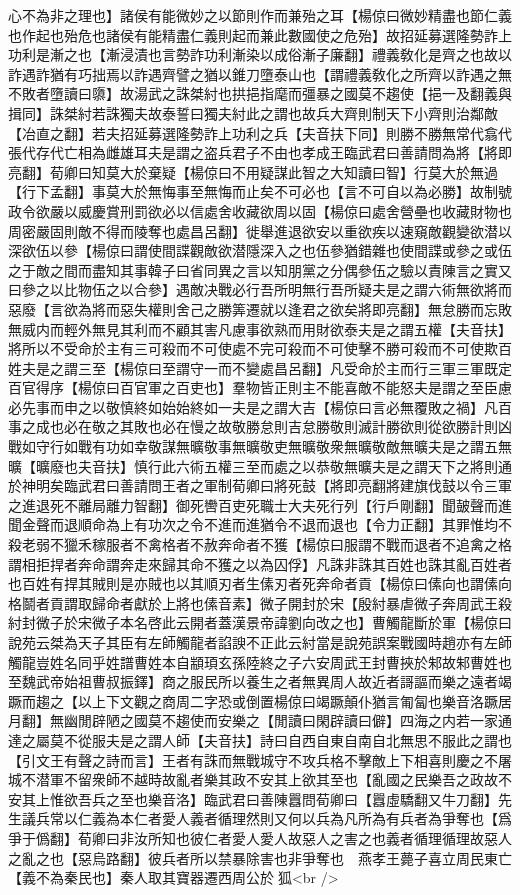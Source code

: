 心不為非之理也】諸侯有能微妙之以節則作而兼殆之耳【楊倞曰微妙精盡也節仁義也作起也殆危也諸侯有能精盡仁義則起而兼此數國使之危殆】故招延募選隆勢詐上功利是漸之也【漸浸漬也言勢詐功利漸染以成俗漸子廉翻】禮義敎化是齊之也故以詐遇詐猶有巧拙焉以詐遇齊譬之猶以錐刀墮泰山也【謂禮義敎化之所齊以詐遇之無不敗者墮讀曰隳】故湯武之誅桀紂也拱挹指麾而彊暴之國莫不趨使【挹一及翻義與揖同】誅桀紂若誅獨夫故泰誓曰獨夫紂此之謂也故兵大齊則制天下小齊則治鄰敵【冶直之翻】若夫招延募選隆勢詐上功利之兵【夫音扶下同】則勝不勝無常代翕代張代存代亡相為雌雄耳夫是謂之盗兵君子不由也孝成王臨武君曰善請問為將【將即亮翻】荀卿曰知莫大於棄疑【楊倞曰不用疑謀此智之大知讀曰智】行莫大於無過【行下孟翻】事莫大於無悔事至無悔而止矣不可必也【言不可自以為必勝】故制號政令欲嚴以威慶賞刑罰欲必以信處舍收藏欲周以固【楊倞曰處舍營壘也收藏財物也周密嚴固則敵不得而陵奪也處昌呂翻】徙舉進退欲安以重欲疾以速窺敵觀變欲潜以深欲伍以參【楊倞曰謂使間諜觀敵欲潜隱深入之也伍參猶錯雜也使間諜或參之或伍之于敵之間而盡知其事韓子曰省同異之言以知朋黨之分偶參伍之驗以責陳言之實又曰參之以比物伍之以合參】遇敵决戰必行吾所明無行吾所疑夫是之謂六術無欲將而惡廢【言欲為將而惡失權則舍己之勝筭遷就以逢君之欲矣將即亮翻】無怠勝而忘敗無威内而輕外無見其利而不顧其害凡慮事欲熟而用財欲泰夫是之謂五權【夫音扶】將所以不受命於主有三可殺而不可使處不完可殺而不可使擊不勝可殺而不可使欺百姓夫是之謂三至【楊倞曰至謂守一而不變處昌呂翻】凡受命於主而行三軍三軍既定百官得序【楊倞曰百官軍之百吏也】羣物皆正則主不能喜敵不能怒夫是謂之至臣慮必先事而申之以敬慎終如始始終如一夫是之謂大吉【楊倞曰言必無覆敗之禍】凡百事之成也必在敬之其敗也必在慢之故敬勝怠則吉怠勝敬則滅計勝欲則從欲勝計則凶戰如守行如戰有功如幸敬謀無曠敬事無曠敬吏無曠敬衆無曠敬敵無曠夫是之謂五無曠【曠廢也夫音扶】慎行此六術五權三至而處之以恭敬無曠夫是之謂天下之將則通於神明矣臨武君曰善請問王者之軍制荀卿曰將死鼓【將即亮翻將建旗伐鼓以令三軍之進退死不離局離力智翻】御死轡百吏死職士大夫死行列【行戶剛翻】聞皷聲而進聞金聲而退順命為上有功次之令不進而進猶令不退而退也【令力正翻】其罪惟均不殺老弱不獵禾稼服者不禽格者不赦奔命者不獲【楊倞曰服謂不戰而退者不追禽之格謂相拒捍者奔命謂奔走來歸其命不獲之以為囚俘】凡誅非誅其百姓也誅其亂百姓者也百姓有捍其賊則是亦賊也以其順刃者生傃刃者死奔命者貢【楊倞曰傃向也謂傃向格鬬者貢謂取歸命者獻於上將也傃音素】微子開封於宋【殷紂暴虐微子奔周武王殺紂封微子於宋微子本名啓此云開者蓋漢景帝諱劉向改之也】曹觸龍斷於軍【楊倞曰說苑云桀為天子其臣有左師觸龍者諂諛不正此云紂當是說苑誤案戰國時趙亦有左師觸龍豈姓名同乎姓譜曹姓本自顓頊玄孫陸終之子六安周武王封曹挾於邾故邾曹姓也至魏武帝始祖曹叔振鐸】商之服民所以養生之者無異周人故近者謌謳而樂之遠者竭蹶而趨之【以上下文觀之商周二字恐或倒置楊倞曰竭蹶顛仆猶言匍匐也樂音洛蹶居月翻】無幽閒辟陋之國莫不趨使而安樂之【閒讀曰閑辟讀曰僻】四海之内若一家通達之屬莫不從服夫是之謂人師【夫音扶】詩曰自西自東自南自北無思不服此之謂也【引文王有聲之詩而言】王者有誅而無戰城守不攻兵格不擊敵上下相喜則慶之不屠城不潜軍不留衆師不越時故亂者樂其政不安其上欲其至也【亂國之民樂吾之政故不安其上惟欲吾兵之至也樂音洛】臨武君曰善陳囂問荀卿曰【囂虛驕翻又牛刀翻】先生議兵常以仁義為本仁者愛人義者循理然則又何以兵為凡所為有兵者為爭奪也【爲爭于僞翻】荀卿曰非汝所知也彼仁者愛人愛人故惡人之害之也義者循理循理故惡人之亂之也【惡烏路翻】彼兵者所以禁暴除害也非爭奪也　燕孝王薨子喜立周民東亡【義不為秦民也】秦人取其寶器遷西周公於狐<br />
